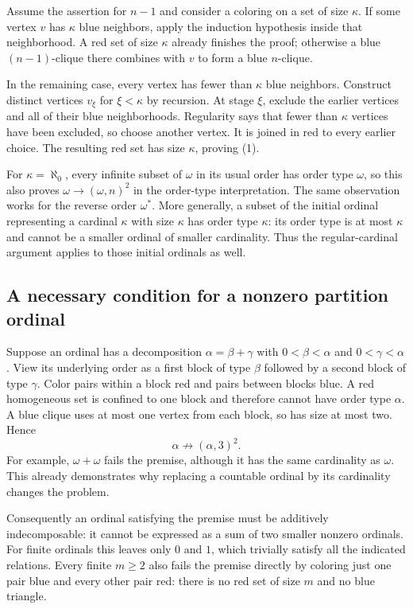 Assume the assertion for $n-1$ and consider a coloring on a set of size $\kappa$. If some vertex $v$ has $\kappa$ blue neighbors, apply the induction hypothesis inside that neighborhood. A red set of size $\kappa$ already finishes the proof; otherwise a blue $(n-1)$-clique there combines with $v$ to form a blue $n$-clique.

In the remaining case, every vertex has fewer than $\kappa$ blue neighbors. Construct distinct vertices $v_\xi$ for $\xi<\kappa$ by recursion. At stage $\xi$, exclude the earlier vertices and all of their blue neighborhoods. Regularity says that fewer than $\kappa$ vertices have been excluded, so choose another vertex. It is joined in red to every earlier choice. The resulting red set has size $\kappa$, proving (1).

For $\kappa=\aleph_0$, every infinite subset of $\omega$ in its usual order has order type $\omega$, so this also proves $\omega\to(\omega,n)^2$ in the order-type interpretation. The same observation works for the reverse order $\omega^*$. More generally, a subset of the initial ordinal representing a cardinal $\kappa$ with size $\kappa$ has order type $\kappa$: its order type is at most $\kappa$ and cannot be a smaller ordinal of smaller cardinality. Thus the regular-cardinal argument applies to those initial ordinals as well.

\subsection{A necessary condition for a nonzero partition ordinal}
Suppose an ordinal has a decomposition $\alpha=\beta+\gamma$ with $0<\beta<\alpha$ and $0<\gamma<\alpha$. View its underlying order as a first block of type $\beta$ followed by a second block of type $\gamma$. Color pairs within a block red and pairs between blocks blue. A red homogeneous set is confined to one block and therefore cannot have order type $\alpha$. A blue clique uses at most one vertex from each block, so has size at most two. Hence
\[
\alpha\not\to(\alpha,3)^2.
\tag{2}
\]
For example, $\omega+\omega$ fails the premise, although it has the same cardinality as $\omega$. This already demonstrates why replacing a countable ordinal by its cardinality changes the problem.

Consequently an ordinal satisfying the premise must be additively indecomposable: it cannot be expressed as a sum of two smaller nonzero ordinals. For finite ordinals this leaves only $0$ and $1$, which trivially satisfy all the indicated relations. Every finite $m\geq2$ also fails the premise directly by coloring just one pair blue and every other pair red: there is no red set of size $m$ and no blue triangle.

